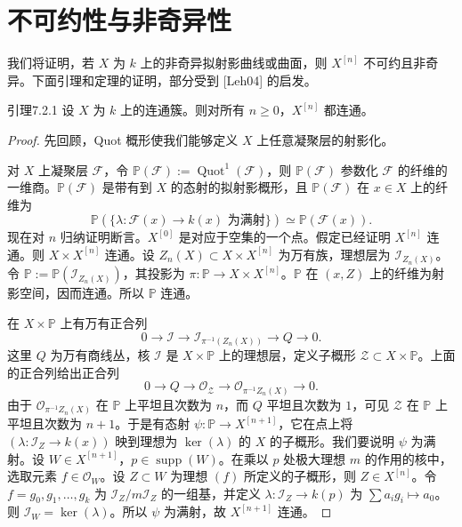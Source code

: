 \section{不可约性与非奇异性}
我们将证明，若 $X$ 为 $k$ 上的非奇异拟射影曲线或曲面，则 $X^{[n]}$ 不可约且非奇异。下面引理和定理的证明，部分受到 [Leh04] 的启发。

\begin{origstatement}{引理}{7.2.1}\label{ch07:7.2.1}
设 $X$ 为 $k$ 上的连通簇。则对所有 $n\geq0$，$X^{[n]}$ 都连通。
\end{origstatement}
\begin{proof}
先回顾，Quot 概形使我们能够定义 $X$ 上任意凝聚层的射影化。

对 $X$ 上凝聚层 $\mathcal F$，令 $\mathbb P(\mathcal F):=\operatorname{Quot}^1(\mathcal F)$，则 $\mathbb P(\mathcal F)$ 参数化 $\mathcal F$ 的纤维的一维商。$\mathbb P(\mathcal F)$ 是带有到 $X$ 的态射的拟射影概形，且 $\mathbb P(\mathcal F)$ 在 $x\in X$ 上的纤维为
\[
\mathbb P(\{\lambda:\mathcal F(x)\to k(x)\text{ 为满射}\})\simeq\mathbb P(\mathcal F(x)).
\]
现在对 $n$ 归纳证明断言。$X^{[0]}$ 是对应于空集的一个点。假定已经证明 $X^{[n]}$ 连通。则 $X\times X^{[n]}$ 连通。设 $Z_n(X)\subset X\times X^{[n]}$ 为万有族，理想层为 $\mathcal I_{Z_n(X)}$。令 $\mathbb P:=\mathbb P(\mathcal I_{Z_n(X)})$，其投影为 $\pi:\mathbb P\to X\times X^{[n]}$。$\mathbb P$ 在 $(x,Z)$ 上的纤维为射影空间，因而连通。所以 $\mathbb P$ 连通。

在 $X\times\mathbb P$ 上有万有正合列
\[
0\longrightarrow\mathcal I\longrightarrow
\mathcal I_{\pi^{-1}(Z_n(X))}\longrightarrow Q\longrightarrow0.
\]
这里 $Q$ 为万有商线丛，核 $\mathcal I$ 是 $X\times\mathbb P$ 上的理想层，定义子概形 $\mathcal Z\subset X\times\mathbb P$。上面的正合列给出正合列
\[
0\longrightarrow Q\longrightarrow\mathcal O_{\mathcal Z}
\longrightarrow\mathcal O_{\pi^{-1}Z_n(X)}\longrightarrow0.
\]
由于 $\mathcal O_{\pi^{-1}Z_n(X)}$ 在 $\mathbb P$ 上平坦且次数为 $n$，而 $Q$ 平坦且次数为 $1$，可见 $\mathcal Z$ 在 $\mathbb P$ 上平坦且次数为 $n+1$。于是有态射 $\psi:\mathbb P\to X^{[n+1]}$，它在点上将 $(\lambda:\mathcal I_Z\to k(x))$ 映到理想为 $\ker(\lambda)$ 的 $X$ 的子概形。我们要说明 $\psi$ 为满射。设 $W\in X^{[n+1]}$，$p\in\operatorname{supp}(W)$。在乘以 $p$ 处极大理想 $m$ 的作用的核中，选取元素 $f\in\mathcal O_W$。设 $Z\subset W$ 为理想 $(f)$ 所定义的子概形，则 $Z\in X^{[n]}$。令 $f=g_0,g_1,\ldots,g_k$ 为 $\mathcal I_Z/m\mathcal I_Z$ 的一组基，并定义 $\lambda:\mathcal I_Z\to k(p)$ 为 $\sum a_ig_i\mapsto a_0$。则 $\mathcal I_W=\ker(\lambda)$。所以 $\psi$ 为满射，故 $X^{[n+1]}$ 连通。
\end{proof}
